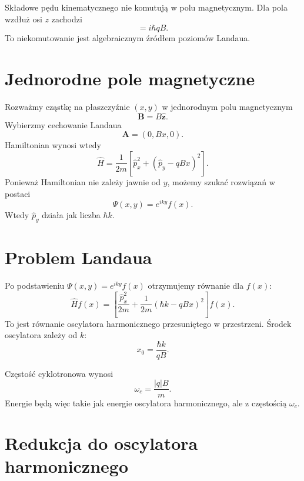 Składowe pędu kinematycznego nie komutują w polu magnetycznym. Dla pola wzdłuż osi \(z\) zachodzi
\begin{equation}
    [\hat{\pi}_x,\hat{\pi}_y]=i\hbar qB.
\end{equation}
To niekomutowanie jest algebraicznym źródłem poziomów Landaua.

\section{Jednorodne pole magnetyczne}

Rozważmy cząstkę na płaszczyźnie \((x,y)\) w jednorodnym polu magnetycznym
\begin{equation}
    \mathbf{B}=B\hat{\mathbf{z}}.
\end{equation}
Wybierzmy cechowanie Landaua
\begin{equation}
    \mathbf{A}=(0,Bx,0).
\end{equation}
Hamiltonian wynosi wtedy
\begin{equation}
    \hat{H}=\frac{1}{2m}\left[\hat{p}_x^2+(\hat{p}_y-qBx)^2\right].
\end{equation}
Ponieważ Hamiltonian nie zależy jawnie od \(y\), możemy szukać rozwiązań w postaci
\begin{equation}
    \Psi(x,y)=e^{iky}f(x).
\end{equation}
Wtedy \(\hat{p}_y\) działa jak liczba \(\hbar k\).

\section{Problem Landaua}

Po podstawieniu \(\Psi(x,y)=e^{iky}f(x)\) otrzymujemy równanie dla \(f(x)\):
\begin{equation}
    \hat{H}f(x)=\left[\frac{\hat{p}_x^2}{2m}+\frac{1}{2m}(\hbar k-qBx)^2\right]f(x).
\end{equation}
To jest równanie oscylatora harmonicznego przesuniętego w przestrzeni. Środek oscylatora zależy od \(k\):
\begin{equation}
    x_0=\frac{\hbar k}{qB}.
\end{equation}

Częstość cyklotronowa wynosi
\begin{equation}
    \omega_c=\frac{|q|B}{m}.
\end{equation}
Energie będą więc takie jak energie oscylatora harmonicznego, ale z częstością \(\omega_c\).

\section{Redukcja do oscylatora harmonicznego}

